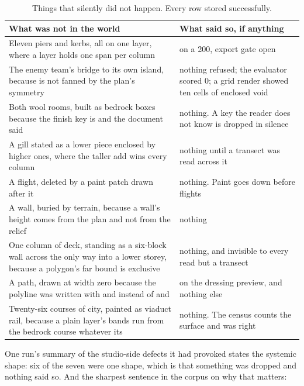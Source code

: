 \begin{table}[htbp]
\caption{Things that silently did not happen. Every row stored successfully.}
\label{tab:silent}
\small
\begin{tabularx}{\textwidth}{Y L{5.0cm}}
\toprule
\textbf{What was not in the world} & \textbf{What said so, if anything} \\
\midrule
Eleven piers and kerbs, all on one layer, where a layer holds one span per column &
   on a 200, export gate open \\
The enemy team's bridge to its own island, because  is not fanned by the
  plan's symmetry &
  nothing refused; the evaluator scored 0; a grid render showed ten cells of
  enclosed void \\
Both wool rooms, built as bedrock boxes because the finish key is  and
  the document said  &
  nothing. A key the reader does not know is dropped in silence \\
A gill stated as a lower piece enclosed by higher ones, where the taller add wins
  every column &
  nothing until a transect was read across it \\
A flight, deleted by a  paint patch drawn after it &
  nothing. Paint goes down before flights \\
A wall, buried by terrain, because a wall's height comes from the plan and not
  from the relief &
  nothing \\
One column of deck, standing as a six-block wall across the only way into a lower
  storey, because a polygon's far bound is exclusive &
  nothing, and invisible to every read but a transect \\
A path, drawn at width zero because the polyline was written with  and
   instead of  and  &
   on the dressing preview, and nothing else \\
Twenty-six courses of city, painted as viaduct rail, because a plain layer's
  bands run from the bedrock course whatever its  &
  nothing. The census counts the surface and was right \\
\bottomrule
\end{tabularx}
\end{table}

One run's summary of the studio-side defects it had provoked states the systemic
shape: six of the seven were one shape, which is that something was dropped and
nothing said so. And the sharpest sentence in the corpus on why that matters:

